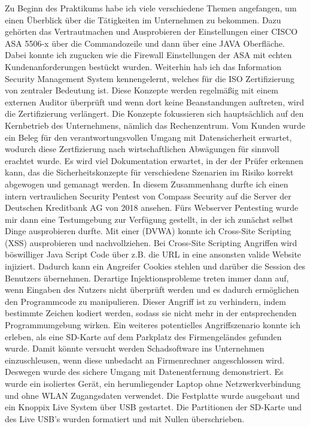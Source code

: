 \documentclass[english,runningheads,a4paper]{llncs}[2018/03/10]
\begin{document}
Zu Beginn des Praktikums habe ich viele verschiedene Themen angefangen, um einen Überblick über die Tätigkeiten im Unternehmen zu bekommen. Dazu gehörten das Vertrautmachen und Ausprobieren der Einstellungen einer CISCO ASA 5506-x über die Commandozeile und dann über eine JAVA Oberfläche. Dabei konnte ich zugucken wie die Firewall Einstellungen der ASA mit echten Kundenanforderungen bestückt wurden. Weiterhin hab ich das Information Security Management System kennengelernt, welches für die ISO Zertifizierung von zentraler Bedeutung ist. Diese Konzepte werden regelmäßig mit einem externen Auditor überprüft und wenn dort keine Beanstandungen auftreten, wird die Zertifizierung verlängert. Die Konzepte fokussieren sich hauptsächlich auf den Kernbetrieb des Unternehmens, nämlich das Rechenzentrum. Vom Kunden wurde ein Beleg für den verantwortungsvollen Umgang mit Datensicherheit erwartet, wodurch diese Zertfizierung nach wirtschaftlichen Abwägungen für sinnvoll erachtet wurde. Es wird viel Dokumentation erwartet, in der der Prüfer erkennen kann, das die Sicherheitskonzepte für verschiedene Szenarien im Risiko korrekt abgewogen und gemanagt werden. 
In diesem Zusammenhang durfte ich einen intern vertraulichen Security Pentest von Compass Security auf die Server der Deutschen Kreditbank AG von 2018 ansehen. Fürs Webserver Pentesting wurde mir dann eine Testumgebung zur Verfügung gestellt, in der ich zunächst selbst Dinge ausprobieren durfte. Mit einer  (DVWA) konnte ich Cross-Site Scripting (XSS) ausprobieren und nachvollziehen. Bei Cross-Site Scripting Angriffen wird böswilliger Java Script Code über z.B. die URL in eine ansonsten valide Website injiziert. Dadurch kann ein Angreifer Cookies stehlen und darüber die Session des Benutzers übernehmen. Derartige Injektionsprobleme treten immer dann auf, wenn Eingaben des Nutzers nicht überprüft werden und es dadurch ermöglichen den Programmcode zu manipulieren. Dieser Angriff ist zu verhindern, indem bestimmte Zeichen kodiert werden, sodass sie nicht mehr in der entsprechenden Programmumgebung wirken.
Ein weiteres potentielles Angriffszenario konnte ich erleben, als eine SD-Karte auf dem Parkplatz des Firmengeländes gefunden wurde. Damit könnte versucht werden Schadsoftware ins Unternehmen einzuschleusen, wenn diese unbedacht an Firmenrechner angeschlossen wird. Deswegen wurde des sichere Umgang mit Datenentfernung demonstriert. Es wurde ein isoliertes Gerät, ein herumliegender Laptop ohne Netzwerkverbindung und ohne WLAN Zugangsdaten verwendet. Die Festplatte wurde ausgebaut und ein Knoppix Live System über USB gestartet. Die Partitionen der SD-Karte und des Live USB's wurden formatiert und mit Nullen überschrieben.
\end{document}
